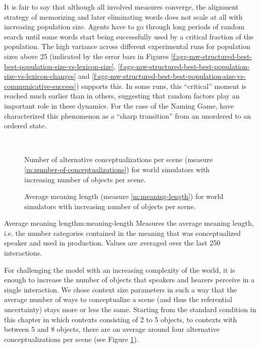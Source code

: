 It is fair to say that although all involved measures converge, the
alignment strategy of memorizing and later eliminating words does not
scale at all with increasing population size. Agents have to go
through long periods of random search until some words start being
successfully used by a critical fraction of the population. The high
variance across different experimental runs for population sizes above
25 (indicated by the error bars in Figures
\ref{f:sgg-mw-structured-best-best-population-size-vs-lexicon-size},
\ref{f:sgg-mw-structured-best-best-population-size-vs-lexicon-changes}
and
\ref{f:sgg-mw-structured-best-best-population-size-vs-communicative-success})
supports this. In some runs, this ``critical'' moment is reached much
earlier than in others, suggesting that random factors play an
important role in these dynamics. For the case of the Naming Game,
\cite{baronchelli06sharp} have characterized this phenomenon as a
``sharp transition'' from an unordered to an ordered state.

~\\

\startfiguregroup

\begin{figure}[t]
  \caption{Number of alternative conceptualizations per scene (measure
    \ref{m:number-of-conceptualizations}) for world simulators with
    increasing number of objects per scene.}
  \label{f:sgg-mw-structured-best-best-context-size-vs-number-of-conceptualizations}
\end{figure}

\begin{figure}[t]
  \caption{Average meaning length (measure \ref{m:meaning-length}) for
    world simulators with increasing number of objects per scene.}
  \label{f:sgg-mw-structured-context-size-vs-meaning-length}
\end{figure}

\stopfiguregroup

\begin{measure}[b]{Average meaning length}{m:meaning-length}
  Measures the average meaning length, i.e. the number categories
  contained in the meaning that was conceptualized speaker and used in
  production. Values are averaged over the last 250 interactions.
\end{measure}


For challenging the model with an increasing complexity of the world,
it is enough to increase the number of objects that speakers and
hearers perceive in a single interaction. We chose context size
parameters in such a way that the average number of ways to
conceptualize a scene (and thus the referential uncertainty) stays
more or less the same. Starting from the standard condition in this
chapter in which contexts consisting of 2 to 5 objects, to contexts
with between 5 and 8 objects, there are on average around four
alternative conceptualizations per scene (see Figure
\ref{f:sgg-mw-structured-best-best-context-size-vs-number-of-conceptualizations}).

